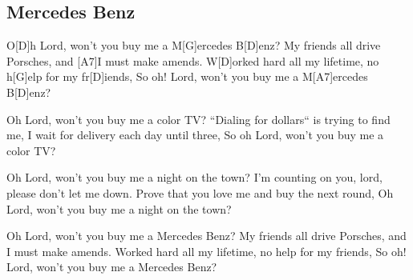 \subsection*{Mercedes Benz   }
\begin{guitar}
O[D]h Lord, won't you buy me a M[G]ercedes B[D]enz?
My friends all drive Porsches, and [A7]I must make amends.
W[D]orked hard all my lifetime, no h[G]elp for my fr[D]iends,
So oh! Lord, won't you buy me a M[A7]ercedes B[D]enz?



Oh Lord, won't you buy me a color TV?
``Dialing for dollars`` is trying to find me,
I wait for delivery each day until three,
So oh Lord, won't you buy me a color TV?



Oh Lord, won't you buy me a night on the town?
I'm counting on you, lord, please don't let me down.
Prove that you love me and buy the next round,
Oh Lord, won't you buy me a night on the town?



Oh Lord, won't you buy me a Mercedes Benz?
My friends all drive Porsches, and I must make amends.
Worked hard all my lifetime, no help for my friends,
So oh! Lord, won't you buy me a Mercedes Benz?
\end{guitar}
